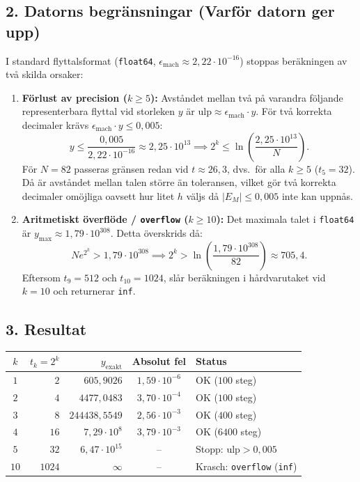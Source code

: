 \documentclass{article}
\begin{document}
\subsection*{2. Datorns begränsningar (Varför datorn ger upp)}
I standard flyttalsformat (\texttt{float64}, $\epsilon_{\text{mach}} \approx 2{,}22 \cdot 10^{-16}$) stoppas beräkningen av två skilda orsaker:
\begin{enumerate}
    \item \textbf{Förlust av precision ($k \ge 5$):} 
    Avståndet mellan två på varandra följande representerbara flyttal vid storleken $y$ är $\text{ulp} \approx \epsilon_{\text{mach}} \cdot y$. För två korrekta decimaler krävs $\epsilon_{\text{mach}} \cdot y \le 0{,}005$:
    \begin{equation}
        y \le \frac{0{,}005}{2{,}22 \cdot 10^{-16}} \approx 2{,}25 \cdot 10^{13} \implies 2^k \le \ln\left(\frac{2{,}25 \cdot 10^{13}}{N}\right).
    \end{equation}
    För $N = 82$ passeras gränsen redan vid $t \approx 26{,}3$, dvs.\ för alla $k \ge 5$ ($t_5 = 32$). Då är avståndet mellan talen större än toleransen, vilket gör två korrekta decimaler  omöjliga oavsett hur litet $h$ väljs då $|E_M| \le 0{,}005$ inte kan uppnås.

    \item \textbf{Aritmetiskt överflöde / \texttt{overflow} ($k \ge 10$):} 
    Det maximala talet i \texttt{float64} är $y_{\max} \approx 1{,}79 \cdot 10^{308}$. Detta överskrids då:
    \begin{equation}
        N e^{2^k} > 1{,}79 \cdot 10^{308} \implies 2^k > \ln\left(\frac{1{,}79 \cdot 10^{308}}{82}\right) \approx 705{,}4.
    \end{equation}
    Eftersom $t_9 = 512$ och $t_{10} = 1024$, slår beräkningen i hårdvarutaket vid $k = 10$ och returnerar \texttt{inf}.
\end{enumerate}

\subsection*{3. Resultat}
\begin{center}
\begin{tabular}{c r r c l}
\hline
$k$ & $t_k = 2^k$ & $y_{\text{exakt}}$ & Absolut fel & Status \\
\hline
$1$ & $2$ & $605{,}9026$ & $1{,}59 \cdot 10^{-6}$ & OK ($100$ steg) \\
$2$ & $4$ & $4477{,}0483$ & $3{,}70 \cdot 10^{-4}$ & OK ($100$ steg) \\
$3$ & $8$ & $244438{,}5549$ & $2{,}56 \cdot 10^{-3}$ & OK ($400$ steg) \\
$4$ & $16$ & $7{,}29 \cdot 10^8$ & $3{,}79 \cdot 10^{-3}$ & OK ($6400$ steg) \\
$5$ & $32$ & $6{,}47 \cdot 10^{15}$ & -- & Stopp: $\text{ulp} > 0{,}005$ \\
$10$ & $1024$ & $\infty$ & -- & Krasch: \texttt{overflow} (\texttt{inf}) \\
\hline
\end{tabular}
\end{center}
\end{document}
